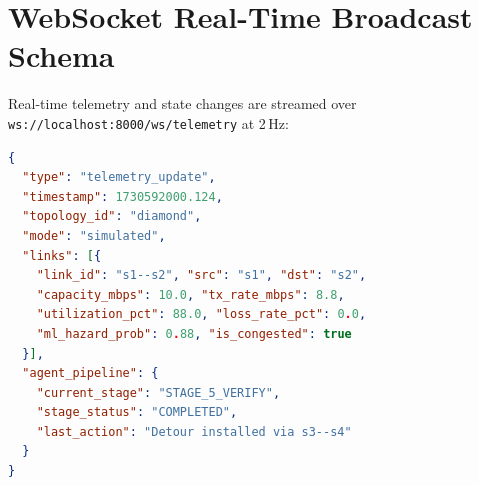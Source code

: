 \section{WebSocket Real-Time Broadcast Schema}
Real-time telemetry and state changes are streamed over \texttt{ws://localhost:8000/ws/telemetry} at 2\,Hz:
\begin{lstlisting}[language=json]
{
  "type": "telemetry_update",
  "timestamp": 1730592000.124,
  "topology_id": "diamond",
  "mode": "simulated",
  "links": [{
    "link_id": "s1--s2", "src": "s1", "dst": "s2",
    "capacity_mbps": 10.0, "tx_rate_mbps": 8.8,
    "utilization_pct": 88.0, "loss_rate_pct": 0.0,
    "ml_hazard_prob": 0.88, "is_congested": true
  }],
  "agent_pipeline": {
    "current_stage": "STAGE_5_VERIFY",
    "stage_status": "COMPLETED",
    "last_action": "Detour installed via s3--s4"
  }
}
\end{lstlisting}
